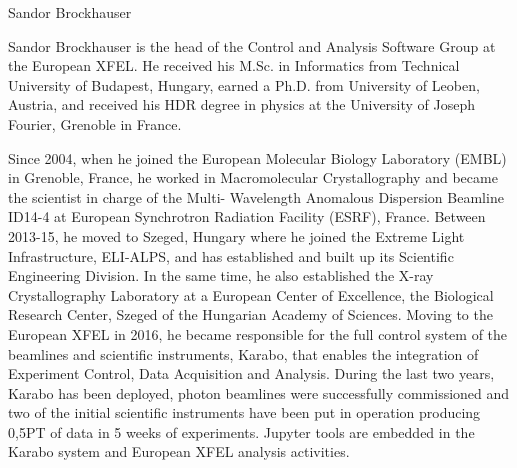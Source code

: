 \begin{participant}[type=PI,PM=1,gender=male]{Sandor Brockhauser}







  \medskip

  Sandor Brockhauser is the head of the Control and Analysis Software
  Group at the European XFEL. He received his M.Sc. in Informatics
  from Technical University of Budapest, Hungary, earned a Ph.D. from
  University of Leoben, Austria, and received his HDR degree in
  physics at the University of Joseph Fourier, Grenoble in
  France.

  Since 2004, when he joined the European Molecular Biology
  Laboratory (EMBL) in Grenoble, France, he worked in Macromolecular
  Crystallography and became the scientist in charge of the Multi-
  Wavelength Anomalous Dispersion Beamline ID14-4 at European
  Synchrotron Radiation Facility (ESRF), France. Between 2013-15, he
  moved to Szeged, Hungary where he joined the Extreme Light
  Infrastructure, ELI-ALPS, and has established and built up its
  Scientific Engineering Division. In the same time, he also
  established the X-ray Crystallography Laboratory at a European
  Center of Excellence, the Biological Research Center, Szeged of the
  Hungarian Academy of Sciences. Moving to the European XFEL in 2016,
  he became responsible for the full control system of the beamlines
  and scientific instruments, Karabo, that enables the integration of
  Experiment Control, Data Acquisition and Analysis. During the last
  two years, Karabo has been deployed, photon beamlines were
  successfully commissioned and two of the initial scientific
  instruments have been put in operation producing 0,5PT of data in 5
  weeks of experiments. Jupyter tools are embedded in the Karabo
  system and European XFEL analysis activities.

\end{participant}

